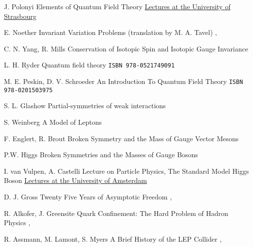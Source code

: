 

{J. Polonyi}
{Elements of Quantum Field Theory}
{\href{http://www-physique.u-strasbg.fr/~polonyi/}{Lectures at the University of Strasbourg}}

{E. Noether}
{Invariant Variation Problems (translation by M. A. Tavel)}
{, }

{C. N. Yang, R. Mills}
{Conservation of Isotopic Spin and Isotopic Gauge Invariance}
{}

{L. H. Ryder}
{Quantum field theory}
{\texttt{ISBN 978-0521749091}}

{M. E. Peskin, D. V. Schroeder}
{An Introduction To Quantum Field Theory}
{\texttt{ISBN 978-0201503975}}

{S. L. Glashow}
{Partial-symmetries of weak interactions}
{}

{S. Weinberg}
{A Model of Leptons}
{}

{F. Englert, R. Brout}
{Broken Symmetry and the Mass of Gauge Vector Mesons}
{}

{P.W. Higgs}
{Broken Symmetries and the Masses of Gauge Bosons}
{}

{I. van Vulpen, A. Castelli}
{Lecture on Particle Physics, The Standard Model Higgs Boson}
{\href{http://www.nikhef.nl/~ivov/Ivo_teaching.html}{Lectures at the University of Amsterdam}}

{D. J. Gross}
{Twenty Five Years of Asymptotic Freedom}
{, }

{R. Alkofer, J. Greensite}
{Quark Confinement: The Hard Problem of Hadron Physics}
{, }

{R. Assmann, M. Lamont, S. Myers}
{A Brief History of the LEP Collider}
{, }

